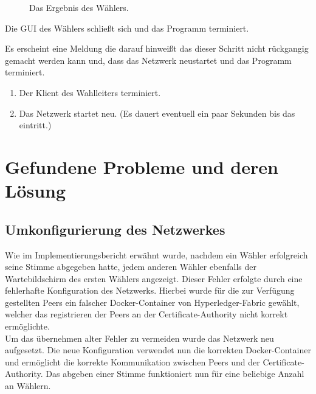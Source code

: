 \documentclass[parskip=full]{scrartcl}
\begin{document}
\begin{figure}[h!]
	\caption{\label{fig:vot_result}
		Das Ergebnis des Wählers.
	}
\end{figure}

		{Die GUI des Wählers schließt sich und das Programm terminiert.}


		{Es erscheint eine Meldung die darauf hinweißt das dieser Schritt nicht rückgangig gemacht werden kann und, dass das Netzwerk neustartet und das Programm terminiert.}

		{\begin{enumerate}
			\item Der Klient des Wahlleiters terminiert.
			\item Das Netzwerk startet neu. (Es dauert eventuell ein paar Sekunden bis das eintritt.)
		\end{enumerate}}

\section{Gefundene Probleme und deren Lösung}
\subsection{Umkonfigurierung des Netzwerkes}
Wie im Implementierungsbericht erwähnt wurde, nachdem ein Wähler erfolgreich seine Stimme abgegeben hatte, jedem anderen Wähler ebenfalls der Wartebildschirm des ersten Wählers angezeigt. Dieser Fehler erfolgte durch eine fehlerhafte Konfiguration des Netzwerks. Hierbei wurde für die zur Verfügung gestellten Peers ein falscher Docker-Container von Hyperledger-Fabric gewählt, welcher das registrieren der Peers an der Certificate-Authority nicht korrekt ermöglichte.
\\
Um das übernehmen alter Fehler zu vermeiden wurde das Netzwerk neu aufgesetzt. Die neue Konfiguration verwendet nun die korrekten Docker-Container und ermöglicht die korrekte Kommunikation zwischen Peers und der Certificate-Authority. Das abgeben einer Stimme funktioniert nun für eine beliebige Anzahl an Wählern.
\end{document}
